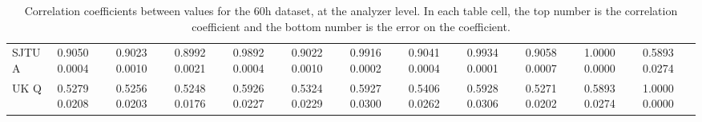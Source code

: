 \begin{landscape}
\begin{table}
\begin{tabularx}{1\linewidth}{@{\extracolsep{\fill}}lXXXXXXXXXXX}
	SJTU A & 0.9050 0.0004 & 0.9023 0.0010 & 0.8992 0.0021 & 0.9892 0.0004 & 0.9022 0.0010 & 0.9916 0.0002 & 0.9041 0.0004 & 0.9934 0.0001 & 0.9058 0.0007 & 1.0000 0.0000 & 0.5893 0.0274  \\
	UK Q   & 0.5279 0.0208 & 0.5256 0.0203 & 0.5248 0.0176 & 0.5926 0.0227 & 0.5324 0.0229 & 0.5927 0.0300 & 0.5406 0.0262 & 0.5928 0.0306 & 0.5271 0.0202 & 0.5893 0.0274 & 1.0000 0.0000  \\
  \bottomrule
\end{tabularx}
\caption[]{Correlation coefficients between \R values for the 60h dataset, at the analyzer level. In each table cell, the top number is the correlation coefficient and the bottom number is the error on the coefficient.}
\label{tab:Corrs_60h_analyzer}
\end{table}
\end{landscape}


